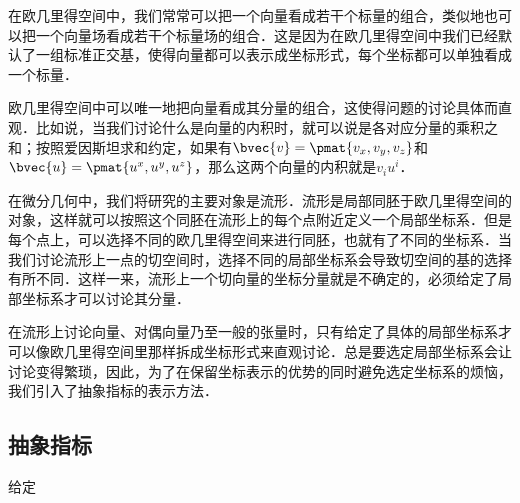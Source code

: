 
\begin{issues}
\issueTODO
\end{issues}



在欧几里得空间中，我们常常可以把一个向量看成若干个标量的组合，类似地也可以把一个向量场看成若干个标量场的组合．这是因为在欧几里得空间中我们已经默认了一组标准正交基，使得向量都可以表示成坐标形式，每个坐标都可以单独看成一个标量．

欧几里得空间中可以唯一地把向量看成其分量的组合，这使得问题的讨论具体而直观．比如说，当我们讨论什么是向量的内积时，就可以说是各对应分量的乘积之和；按照爱因斯坦求和约定，如果有$\bvec{v}=\pmat{v_x, v_y, v_z}$和$\bvec{u}=\pmat{u^x, u^y, u^z}$，那么这两个向量的内积就是$v_iu^i$．

在微分几何中，我们将研究的主要对象是流形．流形是局部同胚于欧几里得空间的对象，这样就可以按照这个同胚在流形上的每个点附近定义一个局部坐标系．但是每个点上，可以选择不同的欧几里得空间来进行同胚，也就有了不同的坐标系．当我们讨论流形上一点的切空间时，选择不同的局部坐标系会导致切空间的基的选择有所不同．这样一来，流形上一个切向量的坐标分量就是不确定的，必须给定了局部坐标系才可以讨论其分量．

在流形上讨论向量、对偶向量乃至一般的张量时，只有给定了具体的局部坐标系才可以像欧几里得空间里那样拆成坐标形式来直观讨论．总是要选定局部坐标系会让讨论变得繁琐，因此，为了在保留坐标表示的优势的同时避免选定坐标系的烦恼，我们引入了抽象指标的表示方法．




\subsection{抽象指标}

给定





